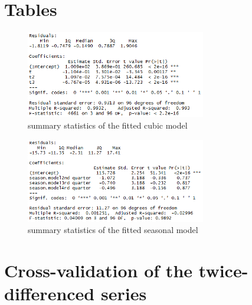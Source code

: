 \documentclass[11pt,a4paper]{article}
\begin{document}
\section{Tables}

\begin{figure}
    \centering
    \includegraphics[width=0.7\textwidth]{summary_cubicmodel}
    \caption{summary statistics of the fitted cubic model}
    \label{fig:summary_cubicmodel}
\end{figure}

\begin{figure}
    \centering
    \includegraphics[width=0.7\textwidth]{summary_seasonmodel}
    \caption{summary statistics of the fitted seasonal model}
    \label{fig:summary_seasonmodel}
\end{figure}



\section{Cross-validation of the twice-differenced series}
\end{document}
